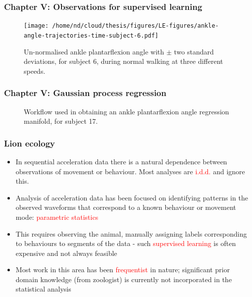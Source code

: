 \documentclass[aspectratio=169]{beamer}
\begin{document}

\begin{frame}
    \frametitle{Chapter V: Observations for supervised learning}
    \begin{figure}
        \centering
        \texttt{[image: /home/nd/cloud/thesis/figures/LE-figures/ankle-angle-trajectories-time-subject-6.pdf]}
        \caption{Un-normalised ankle plantarflexion angle with $\pm$ two standard deviations, for subject 6, during normal walking at three different speeds.}
    \end{figure}
\end{frame}



\begin{frame}
    \frametitle{Chapter V: Gaussian process regression}
    \begin{figure}[ht!]
        \hfill
        \hfill
\caption{Workflow used in obtaining an ankle plantarflexion angle regression manifold, for subject 17.}
    \end{figure}
\end{frame}



\iffalse %
\begin{frame}
    \frametitle{Lion ecology}

    \begin{itemize}
        \item In sequential acceleration data there is a natural dependence between observations of movement or behaviour. Most analyses are \textcolor{red}{i.d.d.} and ignore this.
        \item Analysis of acceleration data
            has been focused on identifying patterns in the observed waveforms that correspond to a known behaviour or movement mode: \textcolor{red}{parametric statistics}
        \item This requires observing the animal, manually assigning labels corresponding to behaviours to segments of the data - such \textcolor{red}{supervised learning} is often expensive and not always feasible
        \item Most work in this area has been \textcolor{red}{frequentist} in nature; significant prior domain knowledge (from zoologist) is currently not incorporated in the statistical analysis
    \end{itemize}

\end{frame}
\end{document}
